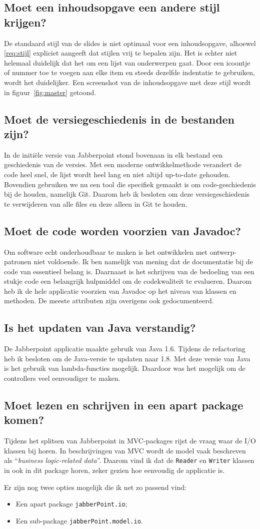\documentclass[a4paper]{article}
\newcommand{\reqref}[1]{\ref{req:#1}}
\newcommand{\question}[1]{
  \subsection{#1}
}
\newcommand{\code}[1]{\lstinline[columns=fixed]{#1}}
\begin{document}
    \question{Moet een inhoudsopgave een andere stijl krijgen?}
		De standaard stijl van de slides is niet optimaal voor een inhoudsopgave, alhoewel \reqref{stijl} expliciet aangeeft dat stijlen vrij te bepalen zijn.
		Het is echter niet helemaal duidelijk dat het om een lijst van onderwerpen gaat.
		Door een icoontje of nummer toe te voegen aan elke item en steeds dezelfde indentatie te gebruiken, wordt het duidelijker.
		Een screenshot van de inhoudsopgave met deze stijl wordt in figuur~\ref{fig:master} getoond.

    \question{Moet de versiegeschiedenis in de bestanden zijn?}
		In de initiële versie van Jabberpoint stond bovenaan in elk bestand een geschiedenis van de versies.
		Met een moderne ontwikkelmethode verandert de code heel snel, de lijst wordt heel lang en niet altijd up-to-date gehouden.
		Bovendien gebruiken we nu een tool die specifiek gemaakt is om code-geschiedenis bij de houden, namelijk Git.
		Daarom heb ik besloten om deze versiegeschiedenis te verwijderen van alle files en deze alleen in Git te houden.

    \question{Moet de code worden voorzien van Javadoc?}
		Om software echt onderhoudbaar te maken is het ontwikkelen met ontwerp-patronen niet voldoende.
		Ik ben namelijk van mening dat de documentatie bij de code van essentieel belang is.
		Daarnaast is het schrijven van de bedoeling van een stukje code een belangrijk hulpmiddel om de codekwaliteit te evalueren.
		Daarom heb ik de hele applicatie voorzien van Javadoc op het niveau van klassen en methoden.
		De meeste attributen zijn overigens ook gedocumenteerd.

	\question{Is het updaten van Java verstandig?}
		De Jabberpoint applicatie maakte gebruik van Java 1.6.
		Tijdens de refactoring heb ik besloten om de Java-versie te updaten naar 1.8.
		Met deze versie van Java is het gebruik van lambda-functies mogelijk.
		Daardoor was het mogelijk om de controllers veel eenvoudiger te maken.

	\question{Moet lezen en schrijven in een apart package komen?}
		Tijdens het splitsen van Jabberpoint in MVC-packages rijst de vraag waar de I/O klassen bij horen.
		In beschrijvingen van MVC wordt de model vaak beschreven als ``\textit{business logic-related data}''.
		Daarom vind ik dat de \code{Reader} en \code{Writer} klassen in ook in dit package horen, zeker gezien hoe eenvoudig de applicatie is.

		Er zijn nog twee opties mogelijk die ik net zo passend vind:
		\begin{itemize}
			\item Een apart package \code{jabberPoint.io};
			\item Een sub-package \code{jabberPoint.model.io}.
		\end{itemize}
\end{document}
